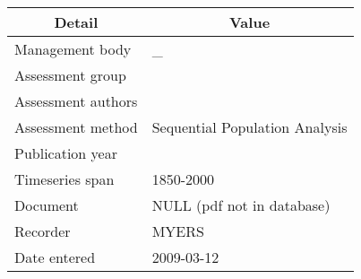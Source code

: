 \begin{table}[htb]
\centering
\begin{tabular}{lp{7cm}}
\toprule
\multicolumn{1}{c}{\textbf{Detail}} & \multicolumn{1}{c}{\textbf{Value}} \\
\midrule
Management body    & \_                             \\
Assessment group   &                                \\
Assessment authors &                                \\
Assessment method  & Sequential Population Analysis \\
Publication year   &                                \\
Timeseries span    & 1850-2000                      \\
Document           & NULL (pdf not in database)     \\
Recorder           & MYERS                          \\
Date entered       & 2009-03-12                     \\
\bottomrule
\end{tabular}
\label{tab:assessdet}
\end{table}
